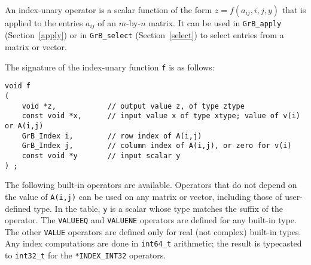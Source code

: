 \documentclass[12pt]{article}
\begin{document}
An index-unary operator is a scalar function of the form
$z=f(a_{ij},i,j,y)$ that is applied to the entries $a_{ij}$ of an
$m$-by-$n$ matrix.  It can be used in \verb'GrB_apply' (Section~\ref{apply}) or
in \verb'GrB_select' (Section~\ref{select}) to select entries from a matrix or
vector.

The signature of the index-unary function \verb'f' is as follows:

{\footnotesize
\begin{verbatim}
void f
(
    void *z,            // output value z, of type ztype
    const void *x,      // input value x of type xtype; value of v(i) or A(i,j)
    GrB_Index i,        // row index of A(i,j)
    GrB_Index j,        // column index of A(i,j), or zero for v(i)
    const void *y       // input scalar y
) ; \end{verbatim}}

The following built-in operators are available.  Operators that do not depend
on the value of \verb'A(i,j)' can be used on any matrix or vector, including
those of user-defined type.  In the table, \verb'y' is a
scalar whose type matches the suffix of the operator.  The \verb'VALUEEQ' and
\verb'VALUENE' operators are defined for any built-in type. The other
\verb'VALUE' operators are defined only for real (not complex) built-in types.
Any index computations are done in \verb'int64_t' arithmetic; the result is
typecasted to \verb'int32_t' for the \verb'*INDEX_INT32' operators.
\end{document}
